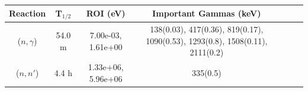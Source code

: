 \begin{table}[h]
\centering
\begin{tabular}{ |c|c|c|c|c|c|c| }
 \hline
 Reaction & T$_{1/2}$ & ROI (eV) & Important Gammas (keV) \\
 \hline 
 ($n,\gamma$) & 54.0 m & 7.00e-03, 1.61e+00 & 138(0.03), 417(0.36), 819(0.17), 1090(0.53), 1293(0.8), 1508(0.11), 2111(0.2) \\ 
\hline
 ($n,n'$) &  4.4 h & 1.33e+06, 5.96e+06 & 335(0.5) \\ 
\hline
\end{tabular}
\end{table}
